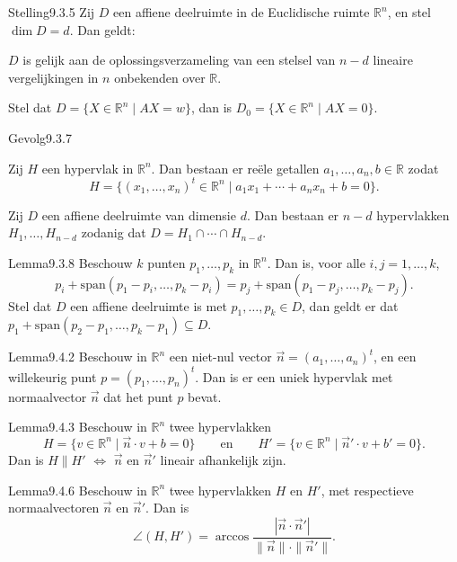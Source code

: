 \begin{res}{Stelling}{9.3.5}
Zij $D$ een affiene deelruimte in de Euclidische ruimte $\mathbb R^n$, en stel $\dim D=d$. Dan geldt:
\begin{myenum}
\item $D$ is gelijk aan de oplossingsverzameling van een stelsel van $n-d$ lineaire vergelijkingen in $n$ onbekenden over $\mathbb R$.
\item Stel dat $D=\{X\in\mathbb R^n\mid AX=w\}$, dan is $D_0=\{X\in\mathbb R^n\mid AX=0\}$.
\end{myenum}
\end{res}

\begin{res}{Gevolg}{9.3.7}
\begin{myenum}
\item Zij $H$ een hypervlak in $\mathbb R^n$. Dan bestaan er re\"ele getallen $a_1,\dots,a_n,b\in\mathbb R$ zodat
\[
H=\{(x_1,\dots,x_n)^t\in\mathbb R^n \mid a_1x_1+\cdots+a_nx_n+b=0\}.
\]
\item Zij $D$ een affiene deelruimte van dimensie $d$. Dan bestaan er $n-d$ hypervlakken $H_1,\dots,H_{n-d}$ zodanig dat $D=H_1\cap\cdots\cap H_{n-d}$.
\end{myenum}
\end{res}

\begin{res}{Lemma}{9.3.8}
Beschouw $k$ punten $p_1,\dots,p_k$ in $\mathbb R^n$. Dan is, voor alle $i,j=1,\dots,k$,
\[
p_i+\mathrm{span}(p_1-p_i,\dots,p_k-p_i)=p_j+\mathrm{span}(p_1-p_j,\dots,p_k-p_j).
\]
Stel dat $D$ een affiene deelruimte is met $p_1,\dots,p_k\in D$, dan geldt er dat $p_1+\mathrm{span}(p_2-p_1,\dots,p_k-p_1)\subseteq D$.
\end{res}

\begin{res}{Lemma}{9.4.2}
Beschouw in $\mathbb R^n$ een niet-nul vector $\vec n=(a_1,\dots,a_n)^t$, en een willekeurig punt $p=(p_1,\dots,p_n)^t$. Dan is er een uniek hypervlak met normaalvector $\vec n$ dat het punt $p$ bevat.
\end{res}

\begin{res}{Lemma}{9.4.3}
Beschouw in $\mathbb R^n$ twee hypervlakken
\[
H=\{v\in\mathbb R^n \mid \vec n\cdot v+b=0\} \qquad\text{en}\qquad H'=\{v\in\mathbb R^n\mid \vec n'\cdot v+b'=0\}.
\]
Dan is $H\parallel H'$ \(\iff\) $\vec n$ en $\vec n'$ lineair afhankelijk zijn.
\end{res}

\begin{res}{Lemma}{9.4.6}
Beschouw in $\mathbb R^n$ twee hypervlakken $H$ en $H'$, met respectieve normaalvectoren $\vec n$ en $\vec n'$. Dan is
\[
\angle(H,H')=\arccos\frac{|\vec n\cdot \vec n'|}{\|\vec n\|\cdot\|\vec n'\|}.
\]
\end{res}

